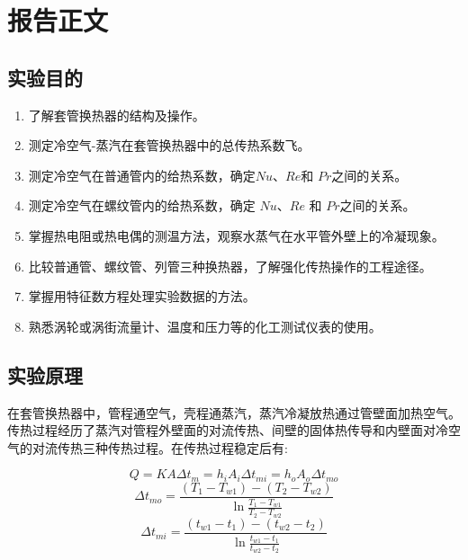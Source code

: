 \documentclass[a4paper,UTF8]{ctexrep}
\theoremstyle{plain}
\theoremstyle{definition}
\numberwithin{equation}{chapter}
\begin{document}
	
	

        \chapter{报告正文}
	\section{实验目的}
	\begin{enumerate}
	\item 了解套管换热器的结构及操作。
\item 测定冷空气-蒸汽在套管换热器中的总传热系数飞。
\item 测定冷空气在普通管内的给热系数，确定$Nu$、$Re$和 $Pr$之间的关系。
\item 测定冷空气在螺纹管内的给热系数，确定 $Nu$、$Re$ 和 $Pr$之间的关系。
\item 掌握热电阻或热电偶的测温方法，观察水蒸气在水平管外壁上的冷凝现象。
\item 比较普通管、螺纹管、列管三种换热器，了解强化传热操作的工程途径。
\item 掌握用特征数方程处理实验数据的方法。
\item 熟悉涡轮或涡街流量计、温度和压力等的化工测试仪表的使用。
	\end{enumerate}

        \section{实验原理}

        在套管换热器中，管程通空气，壳程通蒸汽，蒸汽冷凝放热通过管壁面加热空气。传热过程经历了蒸汽对管程外壁面的对流传热、间壁的固体热传导和内壁面对冷空气的对流传热三种传热过程。在传热过程稳定后有:

        \begin{equation}
            Q=KA\Delta t_m=h_i A_i \Delta t_{mi}=h_o A_o \Delta t_{mo}
        \end{equation}
        \begin{equation}
            \Delta t_{mo}=\frac{(T_1 -T_{w1})-(T_2 -T_{w2})}{\ln\frac{T_1 -T_{w1}}{T_2 -T_{w2}}}
        \end{equation}
        \begin{equation}
            \Delta t_{mi}=\frac{(t_{w1} -t_{1})-(t_{w2} -t_{2})}{\ln\frac{t_{w1} -t_{1}}{t_{w2} -t_{2}}}
        \end{equation}
\end{document}
